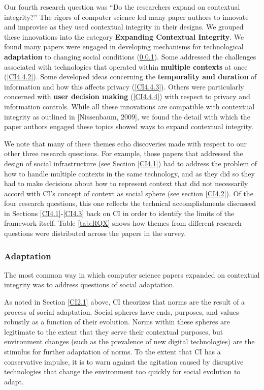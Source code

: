 \documentclass[../thesis.tex]{subfiles}
\begin{document}
Our fourth research question was ``Do the researchers
expand on contextual integrity?'' The rigors of
computer science led many paper authors to innovate and improvise as
they used contextual integrity in their designs. We grouped these
innovations into the category \textbf{Expanding Contextual Integrity}.
We found many papers were engaged in developing mechanisms for
technological \textbf{adaptation} to changing social conditions
(\ref{CI4.4.1}). Some addressed the challenges associated with technologies
that operated within \textbf{multiple contexts} at once (\ref{CI4.4.2}). Some
developed ideas concerning the \textbf{temporality and duration} of
information and how this affects privacy (\ref{CI4.4.3}). Others were
particularly concerned with \textbf{user decision making} (\ref{CI4.4.4}) with
respect to privacy and information controls. While all these
innovations are compatible with contextual integrity as outlined in
[Nissenbaum, 2009], we found the detail with which the paper authors
engaged these topics showed ways to expand contextual integrity.

We note that many of these themes echo discoveries made with respect to
our other three research questions. For example, those papers that
addressed the design of social infrastructure (see Section \ref{CI4.1}) had to
address the problem of how to handle multiple contexts in the same
technology, and as they did so they had to make decisions about how to
represent context that did not necessarily accord with
CI's concept of context as social sphere (see section
\ref{CI4.2}). Of the four research questions, this one reflects the technical
accomplishments discussed in Sections \ref{CI4.1}-\ref{CI4.3}
back on CI in order to
identify the limits of the framework itself. Table \ref{tab:RQX} shows how themes
from different research questions were distributed across the papers in
the survey.

\subsubsection{Adaptation}
\label{CI4.4.1}

The most common way in which computer science papers expanded on
contextual integrity was to address questions of social adaptation.

As noted in Section \ref{CI2.1} above, CI theorizes that norms are the result of
a process of social adaptation. Social spheres have ends, purposes, and
values robustly as a function of their evolution. Norms within these
spheres are legitimate to the extent that they serve their contextual
purposes, but environment changes (such as the prevalence of new
digital technologies) are the stimulus for further adaptation of norms.
To the extent that CI has a conservative impulse, it is to warn against
the agitation caused by disruptive technologies that change the
environment too quickly for social evolution to adapt.
\end{document}
